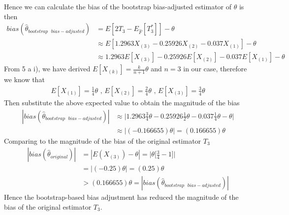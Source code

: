 \documentclass[a4paper,11pt]{article}
\begin{document}
\begin{enumerate}[a)]
	Hence we can calculate the bias of the bootstrap bias-adjusted estimator of $\theta$ is then
	\begin{align*}
		bias(\hat{\theta}_{bootstrap\mbox{ }bias-adjusted}) & = E[2T_3-E_{\hat{F}}[T^*_3]] - \theta \\
		&\approx E[1.2963X_{(3)}-   0.25926X_{(2)}  - 0.037 X_{(1)} ] - \theta \\
		&\approx1.2963E[X_{(3)}]-   0.25926E[X_{(2)}]  - 0.037 E[X_{(1)} ] - \theta
	\end{align*}
	From 5 a i), we have derived $E[X_{(k)}] =  \frac{k}{n+1} \theta$ and $n=3$ in our case, therefore we know that 
	\begin{align*}
	E[X_{(1)}] = \frac{1}{4}\theta \mbox{ ,  } E[X_{(2)}] = \frac{2}{4}\theta  \mbox{  , } E[X_{(3)}] = \frac{3}{4}\theta
	\end{align*}
	Then substitute the above expected value to obtain the magnitude of the bias
	\begin{align*}
	|bias(\hat{\theta}_{bootstrap\mbox{ }bias-adjusted})| & \approx \bigg|1.2963 \frac{3}{4} \theta-   0.25926 \frac{1}{2}\theta  - 0.037 \frac{1}{4}\theta - \theta\bigg| \\ 
	& \approx |(-0.166655) \theta| = (0.166655)\theta
	\end{align*}
	Comparing to the magnitude of the bias of the original estimator $T_3$
	\begin{align*}
		|bias(\hat{\theta}_{original})| &= |E(X_{(3)}) - \theta| =\bigg| \theta\bigg[\frac{3}{4}-1\bigg]\bigg|\\
		&= |(-0.25)\theta| = (0.25) \theta\\
		&>(0.166655)\theta = |bias(\hat{\theta}_{bootstrap\mbox{ }bias-adjusted})| 
	\end{align*}
	Hence the bootstrap-based bias adjustment has reduced the magnitude of the bias of the original estimator $T_3$.
\end{enumerate}
\end{document}
